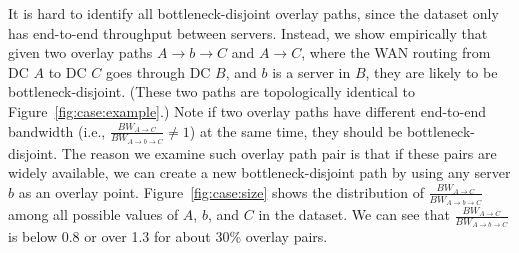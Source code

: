 It is hard to identify all bottleneck-disjoint overlay paths,
since the dataset only has end-to-end throughput between
servers.
Instead, we show empirically that given two overlay
paths $A$$\rightarrow$$b$$\rightarrow$$C$ and $A$$\rightarrow$$C$,
where the WAN routing from DC $A$ to DC $C$ goes through DC $B$,
and $b$ is a server in $B$, they are likely to be
bottleneck-disjoint.
(These two paths are topologically identical to
Figure~\ref{fig:case:example}.)
Note if two overlay paths have different end-to-end bandwidth
(i.e., $\frac{BW_{A\rightarrow C}}{BW_{A\rightarrow b\rightarrow C}}\neq1$)
at the same time,
they should be bottleneck-disjoint.
The reason we examine such overlay path pair is that
if these pairs are widely available, we can
create a new bottleneck-disjoint path by using any server $b$
as an overlay point.
Figure~\ref{fig:case:size} shows the distribution of
$\frac{BW_{A\rightarrow C}}{BW_{A\rightarrow b\rightarrow C}}$
among all possible values of $A$, $b$, and $C$ in the dataset.
We can see that $\frac{BW_{A\rightarrow C}}{BW_{A\rightarrow b\rightarrow C}}$ is
below 0.8 or over 1.3 for about 30\% overlay pairs.





